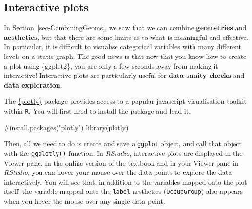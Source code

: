 \documentclass[
  letterpaper,
  DIV=11,
  numbers=noendperiod]{scrreprt}
\newenvironment{Shaded}{\begin{snugshade}}{\end{snugshade}}
\newcommand{\CommentTok}[1]{\textcolor[rgb]{0.37,0.37,0.37}{#1}}
\newcommand{\FunctionTok}[1]{\textcolor[rgb]{0.28,0.35,0.67}{#1}}
\newcommand{\NormalTok}[1]{\textcolor[rgb]{0.00,0.23,0.31}{#1}}
\begin{document}
\subsection{Interactive plots}\label{sec-InteractivePlots}

In Section~\ref{sec-CombiningGeoms}, we saw that we can combine
\textbf{geometries} and \textbf{aesthetics}, but that there are some
limits as to what is meaningful and effective. In particular, it is
difficult to visualise categorical variables with many different levels
on a static graph. The good news is that now that you know how to create
a plot using \{ggplot2\}, you are only a few seconds away from making it
interactive! Interactive plots are particularly useful for \textbf{data
sanity checks} and \textbf{data exploration}.

The \href{https://plotly-r.com}{\{plotly\}} package provides access to a
popular javascript visualisation toolkit within \texttt{R}. You will
first need to install the package and load it.

\begin{Shaded}
\begin{Highlighting}[]
\CommentTok{\#install.packages("plotly")}
\FunctionTok{library}\NormalTok{(plotly)}
\end{Highlighting}
\end{Shaded}

Then, all we need to do is create and save a \texttt{ggplot} object, and
call that object with the \texttt{ggplotly()} function. In
\emph{RStudio}, interactive plots are displayed in the Viewer pane. In
the online version of the textbook and in your Viewer pane in
\emph{RStudio}, you can hover your mouse over the data points to explore
the data interactively. You will see that, in addition to the variables
mapped onto the plot itself, the variable mapped onto the \texttt{label}
aesthetics (\texttt{OccupGroup}) also appears when you hover the mouse
over any single data point.
\end{document}
